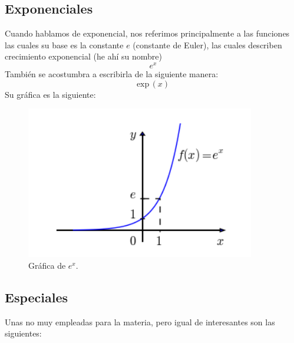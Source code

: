 \documentclass[letterpaper, 12pt]{article}
\begin{document}
        \subsection{Exponenciales}
        Cuando hablamos de exponencial, nos referimos principalmente a las funciones las cuales su base es la constante \(e\) (constante de Euler), las cuales describen crecimiento exponencial (he ahí su nombre)
        \[e^x\]
        También se acostumbra a escribirla de la siguiente manera:
        \[\text{exp}\,(x)\]
        Su gráfica es la siguiente:
        \begin{figure}[H]
            \centering
            \includegraphics[width=10cm]{etothex.png}
            \caption{Gráfica de \(e^x\).}
        \end{figure}
        \subsection{Especiales}
        Unas no muy empleadas para la materia, pero igual de interesantes son las siguientes:
\end{document}
